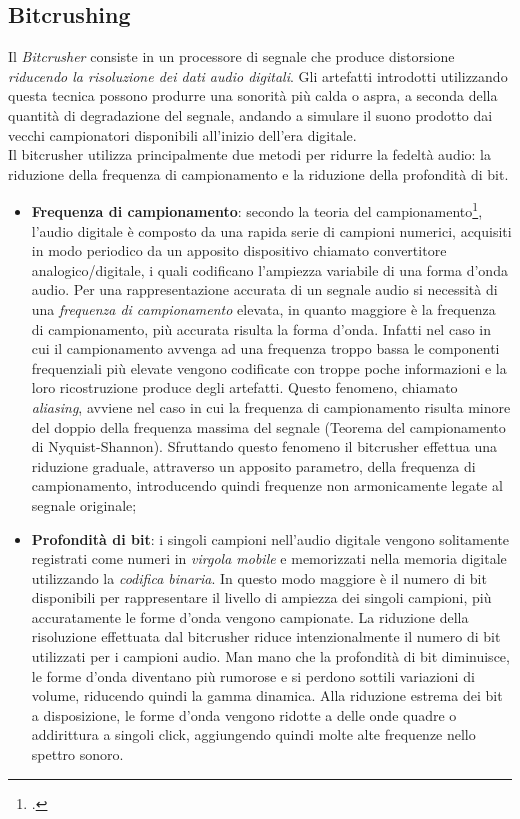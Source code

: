 \subsection{Bitcrushing}
Il \textit{Bitcrusher} consiste in un processore di segnale che produce distorsione \textit{riducendo la risoluzione dei dati audio digitali}. Gli artefatti introdotti utilizzando questa tecnica possono produrre una sonorità più calda o aspra, a seconda della quantità di degradazione del segnale, andando a simulare il suono prodotto dai vecchi campionatori disponibili all'inizio dell'era digitale. \\
Il bitcrusher utilizza principalmente due metodi per ridurre la fedeltà audio: la riduzione della frequenza di campionamento e la riduzione della profondità di bit.
\begin{itemize}
    \item \textbf{Frequenza di campionamento}: secondo la teoria del campionamento\footcite{burk-polansky-repetto-roberts-rockmore:musicandcomputers}, l'audio digitale è composto da una rapida serie di campioni numerici, acquisiti in modo periodico da un apposito dispositivo chiamato convertitore analogico/digitale, i quali codificano l'ampiezza variabile di una forma d'onda audio. Per una rappresentazione accurata di un segnale audio si necessità di una \textit{frequenza di campionamento} elevata, in quanto maggiore è la frequenza di campionamento, più accurata risulta la forma d'onda. Infatti nel caso in cui il campionamento avvenga ad una frequenza troppo bassa le componenti frequenziali più elevate vengono codificate con troppe poche informazioni e la loro ricostruzione produce degli artefatti. Questo fenomeno, chiamato \textit{aliasing}, avviene nel caso in cui la frequenza di campionamento risulta minore del doppio della frequenza massima del segnale (Teorema del campionamento di Nyquist-Shannon). Sfruttando questo fenomeno il bitcrusher effettua una riduzione graduale, attraverso un apposito parametro, della frequenza di campionamento, introducendo quindi frequenze non armonicamente legate al segnale originale;
    \item \textbf{Profondità di bit}: i singoli campioni nell'audio digitale vengono solitamente registrati come numeri in \textit{virgola mobile} e memorizzati nella memoria digitale utilizzando la \textit{codifica binaria}. In questo modo maggiore è il numero di bit disponibili per rappresentare il livello di ampiezza dei singoli campioni, più accuratamente le forme d'onda vengono campionate. La riduzione della risoluzione effettuata dal bitcrusher riduce intenzionalmente il numero di bit utilizzati per i campioni audio. Man mano che la profondità di bit diminuisce, le forme d'onda diventano più rumorose e si perdono sottili variazioni di volume, riducendo quindi la gamma dinamica. Alla riduzione estrema dei bit a disposizione, le forme d'onda vengono ridotte a delle onde quadre o addirittura a singoli click, aggiungendo quindi molte alte frequenze nello spettro sonoro. 
\end{itemize}
